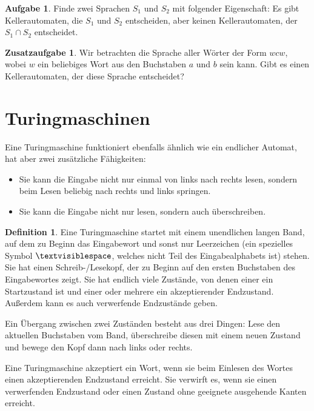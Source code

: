\documentclass[a4paper,ngerman,12pt]{scrartcl}
\theoremstyle{definition}
\newtheorem{defn}{Definition}[]
\newtheorem{aufg}{Aufgabe}
\newtheorem{zaufg}{Zusatzaufgabe}
\theoremstyle{plain}
\theoremstyle{remark}
\begin{document}
\begin{aufg}
	Finde zwei Sprachen $S_1$ und $S_2$ mit folgender Eigenschaft: Es gibt Kellerautomaten, die $S_1$ und $S_2$ entscheiden, aber keinen Kellerautomaten, der $S_1 \cap S_2$ entscheidet.
\end{aufg}

\begin{zaufg}
	Wir betrachten die Sprache aller Wörter der Form $wcw$, wobei $w$ ein beliebiges Wort aus den Buchstaben $a$ und $b$ sein kann. Gibt es einen Kellerautomaten, der diese Sprache entscheidet?
\end{zaufg}

\section{Turingmaschinen}

Eine Turingmaschine funktioniert ebenfalls ähnlich wie ein endlicher Automat, hat aber zwei zusätzliche Fähigkeiten:
\begin{itemize}
	\item Sie kann die Eingabe nicht nur einmal von links nach rechts lesen, sondern beim Lesen beliebig nach rechts und links springen.
	\item Sie kann die Eingabe nicht nur lesen, sondern auch überschreiben.
\end{itemize}

\begin{defn}
	Eine Turingmaschine startet mit einem unendlichen langen Band, auf dem zu Beginn das Eingabewort und sonst nur Leerzeichen (ein spezielles Symbol $\textvisiblespace$, welches nicht Teil des Eingabealphabets ist) stehen. Sie hat einen Schreib-/Lesekopf, der zu Beginn auf den ersten Buchstaben des Eingabewortes zeigt. Sie hat endlich viele Zustände, von denen einer ein Startzustand ist und einer oder mehrere ein akzeptierender Endzustand. Außerdem kann es auch verwerfende Endzustände geben. 
	
	Ein Übergang zwischen zwei Zuständen besteht aus drei Dingen: Lese den aktuellen Buchstaben vom Band, überschreibe diesen mit einem neuen Zustand und bewege den Kopf dann nach links oder rechts.
	
	Eine Turingmaschine akzeptiert ein Wort, wenn sie beim Einlesen des Wortes einen akzeptierenden Endzustand erreicht. Sie verwirft es, wenn sie einen verwerfenden Endzustand oder einen Zustand ohne geeignete ausgehende Kanten erreicht.
\end{defn}
\end{document}
